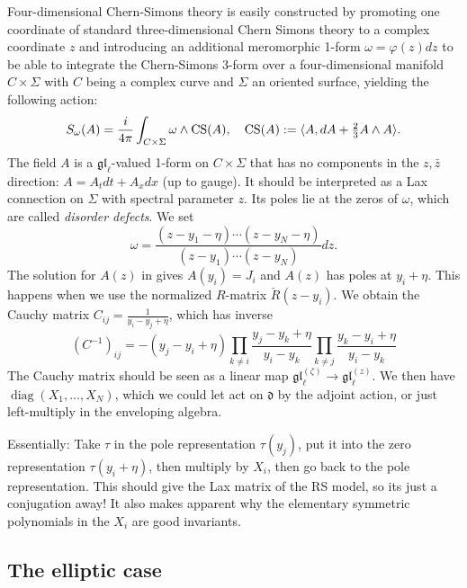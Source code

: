 \documentclass[11pt]{report}
\theoremstyle{definition}
\theoremstyle{remark}
\theoremstyle{remark}
\begin{document}
Four-dimensional Chern-Simons theory is easily constructed by promoting one coordinate of standard three-dimensional Chern Simons theory to a complex coordinate $z$ and introducing an additional meromorphic 1-form $\omega = \varphi(z) dz$ to be able to integrate the Chern-Simons 3-form over a four-dimensional manifold $C \times \Sigma$ with $C$ being a complex curve and $\Sigma$ an oriented surface, yielding the following action:
\begin{equation*}
S_\omega(A) = \frac{i}{4\pi} \int_{C \times \Sigma} \omega \wedge \textnormal{CS}(A), \quad \textnormal{CS}(A) := \langle A, dA + \tfrac 23 A \wedge A \rangle.
\end{equation*}
The field $A$ is a $\mathfrak{gl}_\ell$-valued 1-form on $C \times \Sigma$ that has no components in the $z,\bar z$ direction: $A = A_t dt + A_x dx$ (up to gauge). It should be interpreted as a Lax connection on $\Sigma$ with spectral parameter $z$. Its poles lie at the zeros of $\omega$, which are called \emph{disorder defects}. We set
\begin{equation*}
\omega = \frac{(z-y_1-\eta) \cdots (z-y_N-\eta)}{(z-y_1) \cdots (z-y_N)} dz.
\end{equation*}
The solution for $A(z)$ in \cite{article:lacroix:2021} gives $A(y_i) = J_i$ and $A(z)$ has poles at $y_i+\eta$. This happens when we use the normalized $R$-matrix $\check R(z-y_i)$. We obtain the Cauchy matrix $C_{ij} = \frac{1}{y_i-y_j+\eta}$, which has inverse
\begin{equation*}
(C^{-1})_{ij} = -(y_j-y_i+\eta) \prod_{k \neq i} \frac{y_j-y_k+\eta}{y_i-y_k} \prod_{k \neq j} \frac{y_k-y_i+\eta}{y_i-y_k}
\end{equation*}
The Cauchy matrix should be seen as a linear map $\mathfrak{gl}_\ell^{(\zeta)} \to \mathfrak{gl}_\ell^{(z)}$. We then have $\operatorname{diag}(X_1,...,X_N)$, which we could let act on $\mathfrak{d}$ by the adjoint action, or just left-multiply in the enveloping algebra.

Essentially: Take $\tau$ in the pole representation $\tau(y_j)$, put it into the zero representation $\tau(y_i+\eta)$, then multiply by $X_i$, then go back to the pole representation. This should give the Lax matrix of the RS model, so its just a conjugation away! It also makes apparent why the elementary symmetric polynomials in the $X_i$ are good invariants.

\subsection{The elliptic case}
\end{document}
